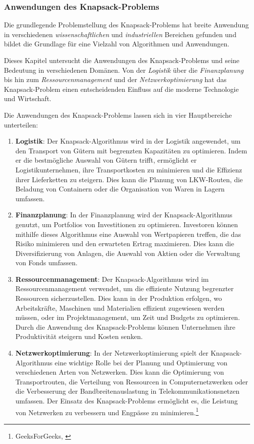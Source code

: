 \subsubsection{Anwendungen des Knapsack-Problems}
Die grundlegende Problemstellung des Knapsack-Problems hat breite Anwendung in verschiedenen \textit{wissenschaftlichen}
und \textit{industriellen} Bereichen gefunden und bildet die Grundlage für eine Vielzahl von Algorithmen und Anwendungen.

Dieses Kapitel untersucht die Anwendungen des Knapsack-Problems und seine Bedeutung in verschiedenen Domänen. Von der
\textit{Logistik} über die \textit{Finanzplanung} bis hin zum \textit{Ressourcenmanagement} und der \textit{Netzwerkoptimierung}
hat das Knapsack-Problem einen entscheidenden Einfluss auf die moderne Technologie und Wirtschaft.

Die Anwendungen des Knapsack-Problems lassen sich in vier Hauptbereiche unterteilen:
\begin{enumerate}
    \item \textbf{Logistik}: Der Knapsack-Algorithmus wird in der Logistik angewendet, um den Transport von Gütern mit
    begrenzten Kapazitäten zu optimieren. Indem er die bestmögliche Auswahl von Gütern trifft, ermöglicht er Logistikunternehmen,
    ihre Transportkosten zu minimieren und die Effizienz ihrer Lieferketten zu steigern. Dies kann die Planung von LKW-Routen,
    die Beladung von Containern oder die Organisation von Waren in Lagern umfassen.
    \item \textbf{Finanzplanung}: In der Finanzplanung wird der Knapsack-Algorithmus genutzt, um Portfolios von Investitionen
    zu optimieren. Investoren können mithilfe dieses Algorithmus eine Auswahl von Wertpapieren treffen, die das Risiko
    minimieren und den erwarteten Ertrag maximieren. Dies kann die Diversifizierung von Anlagen, die Auswahl von Aktien
    oder die Verwaltung von Fonds umfassen.
    \item \textbf{Ressourcenmanagement}: Der Knapsack-Algorithmus wird im Ressourcenmanagement verwendet, um die effiziente
    Nutzung begrenzter Ressourcen sicherzustellen. Dies kann in der Produktion erfolgen, wo Arbeitskräfte, Maschinen und
    Materialien effizient zugewiesen werden müssen, oder im Projektmanagement, um Zeit und Budgets zu optimieren. Durch
    die Anwendung des Knapsack-Problems können Unternehmen ihre Produktivität steigern und Kosten senken.
    \item \textbf{Netzwerkoptimierung}: In der Netzwerkoptimierung spielt der Knapsack-Algorithmus eine wichtige Rolle
    bei der Planung und Optimierung von verschiedenen Arten von Netzwerken. Dies kann die Optimierung von Transportrouten,
    die Verteilung von Ressourcen in Computernetzwerken oder die Verbesserung der Bandbreitenauslastung in Telekommunikationsnetzen
    umfassen. Der Einsatz des Knapsack-Problems ermöglicht es, die Leistung von Netzwerken zu verbessern und Engpässe zu
    minimieren.\footnote{GeeksForGeeks, \cite{Introduction to Knapsack Problem, its Types and How to solve them}}
\end{enumerate}

